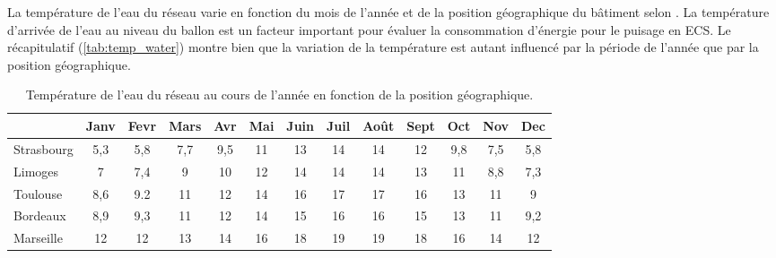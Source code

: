 La température de l'eau du réseau varie en fonction du mois de l'année et de la
position géographique du bâtiment selon .
La température d’arrivée de l’eau au niveau du ballon est un facteur important pour
évaluer la consommation d’énergie pour le puisage en ECS. Le récapitulatif (\autoref{tab:temp_water})
montre bien que la variation de la température est autant influencé par la période de l’année
que par la position géographique.
\begin{table}
\centering
\begin{tabular}{l*{12}{c}}
    \toprule
               & Janv & Fevr & Mars & Avr & Mai & Juin & Juil & Août & Sept & Oct & Nov & Dec \\
    \midrule
    Strasbourg & 5,3  & 5,8  & 7,7  & 9,5 & 11  & 13   & 14   & 14   & 12   & 9,8 & 7,5 & 5,8 \\
    Limoges    & 7    & 7,4  & 9    & 10  & 12  & 14   & 14   & 14   & 13   & 11  & 8,8 & 7,3 \\
    Toulouse   & 8,6  & 9.2  & 11   & 12  & 14  & 16   & 17   & 17   & 16   & 13  & 11  & 9   \\
    Bordeaux   & 8,9  & 9,3  & 11   & 12  & 14  & 15   & 16   & 16   & 15   & 13  & 11  & 9,2 \\
    Marseille  & 12   & 12   & 13   & 14  & 16  & 18   & 19   & 19   & 18   & 16  & 14  & 12  \\
    \bottomrule
\end{tabular}
\caption{Température de l'eau du réseau au cours de l'année en fonction de la
         position géographique.}
         \label{tab:temp_water}
\end{table}


